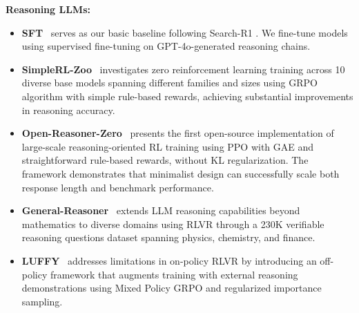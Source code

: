\textbf{Reasoning LLMs:}
\begin{itemize}[leftmargin=1em]
\item \textbf{SFT}~\citep{zeng2025simplerl} serves as our basic baseline following Search-R1 \citep{jin2025search}. We fine-tune models using supervised fine-tuning on GPT-4o-generated reasoning chains. 


\item \textbf{SimpleRL-Zoo}~\citep{zeng2025simplerl} investigates zero reinforcement learning training across 10 diverse base models spanning different families and sizes using GRPO algorithm with simple rule-based rewards, achieving substantial improvements in reasoning accuracy. 

\item \textbf{Open-Reasoner-Zero}~\citep{hu2025open} presents the first open-source implementation of large-scale reasoning-oriented RL training using PPO with GAE and straightforward rule-based rewards, without KL regularization. The framework demonstrates that minimalist design can successfully scale both response length and benchmark performance. 


\item \textbf{General-Reasoner}~\citep{ma2025general} extends LLM reasoning capabilities beyond mathematics to diverse domains using RLVR through a 230K verifiable reasoning questions dataset spanning physics, chemistry, and finance.

\item \textbf{LUFFY}~\citep{yan2025learning} addresses limitations in on-policy RLVR by introducing an off-policy framework that augments training with external reasoning demonstrations using Mixed Policy GRPO and regularized importance sampling.


\end{itemize}

